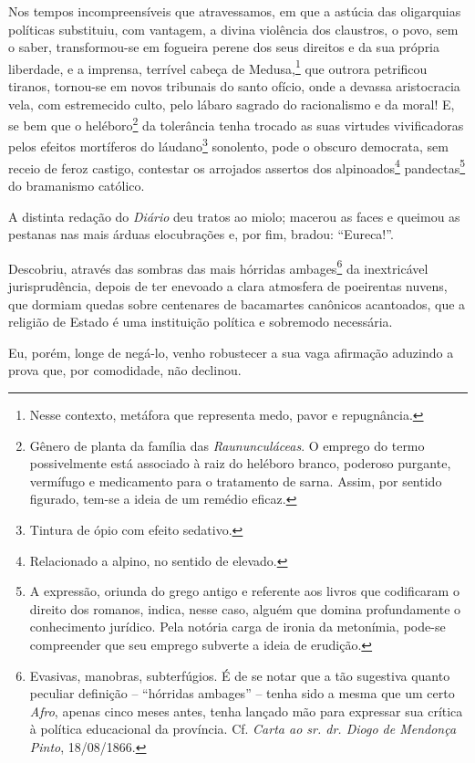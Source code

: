 Nos tempos incompreensíveis que atravessamos, em que a astúcia das
oligarquias políticas substituiu, com vantagem, a divina violência dos
claustros, o povo, sem o saber, transformou-se em fogueira perene dos
seus direitos e da sua própria liberdade, e a imprensa, terrível cabeça
de Medusa,\footnote{Nesse contexto, metáfora que representa medo,
  pavor e repugnância.} que outrora petrificou tiranos, tornou-se em
novos tribunais do santo ofício, onde a devassa aristocracia vela, com
estremecido culto, pelo lábaro sagrado do racionalismo e da moral! E, se
bem que o heléboro\footnote{Gênero de planta da família das
  \emph{Raununculáceas}. O emprego do termo possivelmente está associado
  à raiz do heléboro branco, poderoso purgante, vermífugo e medicamento
  para o tratamento de sarna. Assim, por sentido figurado, tem-se a
  ideia de um remédio eficaz.} da tolerância tenha trocado as suas
virtudes vivificadoras pelos efeitos mortíferos do láudano\footnote{
  Tintura de ópio com efeito sedativo.} sonolento, pode o obscuro
democrata, sem receio de feroz castigo, contestar os arrojados assertos
dos alpinoados\footnote{Relacionado a alpino, no sentido de elevado.}
pandectas\footnote{A expressão, oriunda do grego antigo e referente
  aos livros que codificaram o direito dos romanos, indica, nesse caso,
  alguém que domina profundamente o conhecimento jurídico. Pela notória
  carga de ironia da metonímia, pode-se compreender que seu emprego
  subverte a ideia de erudição.} do bramanismo católico.

A distinta redação do \emph{Diário} deu tratos ao miolo; macerou as
faces e queimou as pestanas nas mais árduas elocubrações e, por fim,
bradou: ``Eureca!''.

Descobriu, através das sombras das mais hórridas ambages\footnote{
  Evasivas, manobras, subterfúgios. É de se notar que a tão sugestiva
  quanto peculiar definição -- ``hórridas ambages'' -- tenha sido a mesma
  que um certo \emph{Afro}, apenas cinco meses antes, tenha lançado mão
  para expressar sua crítica à política educacional da província. Cf.
  \emph{Carta ao sr. dr. Diogo de Mendonça Pinto}, 18/08/1866.} da
inextricável jurisprudência, depois de ter enevoado a clara atmosfera de
poeirentas nuvens, que dormiam quedas sobre centenares de bacamartes
canônicos acantoados, que a religião de Estado é uma instituição
política e sobremodo necessária.

Eu, porém, longe de negá-lo, venho robustecer a sua vaga afirmação
aduzindo a prova que, por comodidade, não declinou.

